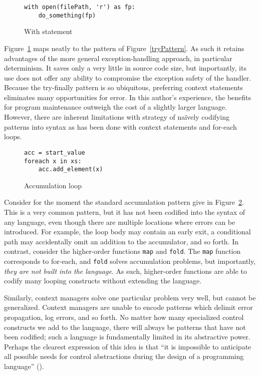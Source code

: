 \documentclass[11pt]{article}
\begin{document}
\begin{figure}[H]
\caption{With statement}
\label{withStatement}
\begin{verbatim}
with open(filePath, 'r') as fp:
    do_something(fp)
\end{verbatim}
\end{figure}

Figure~\ref{withStatement} maps neatly to the pattern of Figure~\ref{tryPattern}.
As such it retains advantages of the more general exception-handling approach, in particular determinism.
It saves only a very little in source code size, but importantly, its use does not offer any ability to compromise the exception safety of the handler.
Because the try-finally pattern is so ubiquitous, preferring context statements eliminates many opportunities for error.
In this author's experience, the benefits for program maintenance outweigh the cost of a slightly larger language.
However, there are inherent limitations with strategy of na\"ively codifying patterns into syntax as has been done with context statements and for-each loops.

\begin{figure}[H]
\caption{Accumulation loop}
\label{accumLoop}
\begin{verbatim}
acc = start_value
foreach x in xs:
    acc.add_element(x)
\end{verbatim}
\end{figure}

Consider for the moment the standard accumulation pattern give in Figure~\ref{accumLoop}.
This is a very common pattern, but it has not been codified into the syntax of any language, even though there are multiple locations where errors can be introduced.
For example, the loop body may contain an early exit, a conditional path may accidentally omit an addition to the accumulator, and so forth.
In contrast, consider the higher-order functions \texttt{map} and \texttt{fold}.
The \texttt{map} function corresponds to for-each, and \texttt{fold} solves accumulation problems, but importantly, \emph{they are not built into the language}.
As such, higher-order functions are able to codify many looping constructs without extending the language.

Similarly, context managers solve one particular problem very well, but cannot be generalized.
Context managers are unable to encode patterns which delimit error propagation, log errors, and so forth.
No matter how many specialized control constructs we add to the language, there will always be patterns that have not been codified; such a language is fundamentally limited in its abstractive power.
Perhaps the clearest expression of this idea is that ``it is impossible to anticipate all possible needs for control abstractions during the design of a programming language'' (\cite{ControlDelimitersHierarchy}).
\end{document}
